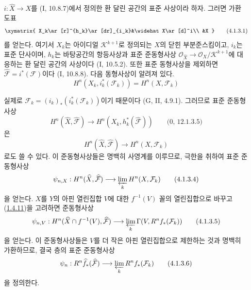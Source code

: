 \begin{env}[4.1.3]
\label{III.4.1.3-fr}
$i:\widehat X\to X$를 (I, 10.8.7)에서 정의한 환 달린 공간의 표준
사상이라 하자. 그러면 가환 도표
\[
\xymatrix{
X_k\ar[r]^{h_k}\ar[dr]_{i_k}&\widehat X\ar[d]^i\\
&X
}
\tag{4.1.3.1}\label{III.4.1.3.1-fr}
\]
를 얻는다. 여기서 $X_k$는 아이디얼 $\mathcal K^{k+1}$로 정의되는
$X$의 닫힌 부분준스킴이고, $i_k$는 표준 단사이며, $h_k$는 바탕공간의
항등사상과 표준 준동형사상
$\mathcal O_{\widehat X}\to\mathcal O_X/\mathcal K^{k+1}$에 대응하는
환 달린 공간의 사상이다 (I, 10.5.2). 또한 표준 동형사상을 제외하면
$\widehat{\mathcal F}=i^*(\mathcal F)$이다 (I, 10.8.8). 다음 동형사상이
알려져 있다.
\[
H^n(X_k,i_k^*(\mathcal F_k))=H^n(X,\mathcal F_k)
\tag{4.1.3.2}\label{III.4.1.3.2-fr}
\]


실제로 $\mathcal F_k=(i_k)_*(i_k^*(\mathcal F_k))$이기 때문이다
(G, II, 4.9.1). 그러므로 표준 준동형사상
\[
H^n(\widehat X,\widehat{\mathcal F})
\longrightarrow H^n(X_k,h_k^*(\widehat{\mathcal F}))
\qquad\text{(0, 12.1.3.5)}
\]
은
\[
H^n(\widehat X,\widehat{\mathcal F})\longrightarrow H^n(X,\mathcal F_k)
\tag{4.1.3.3}\label{III.4.1.3.3-fr}
\]
로도 쓸 수 있다. 이 준동형사상들은 명백히 사영계를 이루므로, 극한을
취하여 표준 준동형사상
\[
\psi_{n,X}:H^n(\widehat X,\widehat{\mathcal F})
\longrightarrow\varprojlim_kH^n(X,\mathcal F_k)
\tag{4.1.3.4}\label{III.4.1.3.4-fr}
\]
을 얻는다. $X$를 $Y$의 아핀 열린집합 $V$에 대한
$f^{-1}(V)$ 꼴의 열린집합으로 바꾸고
(\hyperref[III.1.4.11-fr]{1.4.11})을 고려하면 준동형사상
\[
\psi_{n,V}:H^n(\widehat X\cap f^{-1}(V),\widehat{\mathcal F})
\longrightarrow\varprojlim_k\Gamma(V,R^nf_*(\mathcal F_k))
\tag{4.1.3.5}\label{III.4.1.3.5-fr}
\]
을 얻는다. 이 준동형사상들은 $V$를 더 작은 아핀 열린집합으로 제한하는
것과 명백히 가환하므로, 결국 층의 표준 준동형사상
\[
\psi_n:R^n\widehat f_*(\widehat{\mathcal F})
\longrightarrow\varprojlim_kR^nf_*(\mathcal F_k)
\tag{4.1.3.6}\label{III.4.1.3.6-fr}
\]
을 정의한다.
\end{env}

